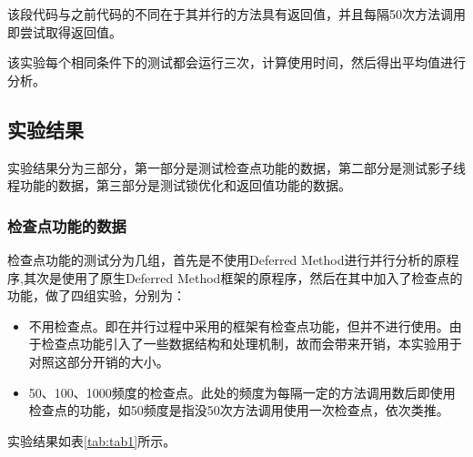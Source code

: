 该段代码与之前代码的不同在于其并行的方法具有返回值，并且每隔50次方法调用即尝试取得返回值。

该实验每个相同条件下的测试都会运行三次，计算使用时间，然后得出平均值进行分析。

\subsection{实验结果}

实验结果分为三部分，第一部分是测试检查点功能的数据，第二部分是测试影子线程功能的数据，第三部分是测试锁优化和返回值功能的数据。

\subsubsection{检查点功能的数据}

检查点功能的测试分为几组，首先是不使用Deferred Method进行并行分析的原程序,其次是使用了原生Deferred Method框架的原程序，然后在其中加入了检查点的功能，做了四组实验，分别为：

\begin{itemize}
	\item 不用检查点。即在并行过程中采用的框架有检查点功能，但并不进行使用。由于检查点功能引入了一些数据结构和处理机制，故而会带来开销，本实验用于对照这部分开销的大小。
	\item 50、100、1000频度的检查点。此处的频度为每隔一定的方法调用数后即使用检查点的功能，如50频度是指没50次方法调用使用一次检查点，依次类推。
\end{itemize}

实验结果如表\ref{tab:tab1}所示。


